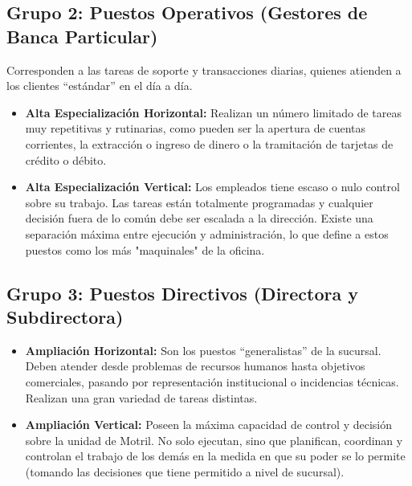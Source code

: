\subsection{Grupo 2: Puestos Operativos (Gestores de Banca Particular)}

Corresponden a las tareas de soporte y transacciones diarias, quienes atienden a los clientes ``estándar'' en el día a día.

\begin{itemize}
\item \textbf{Alta Especialización Horizontal:} Realizan un número limitado de tareas muy repetitivas y rutinarias, como pueden ser la apertura de cuentas corrientes, la extracción o ingreso de dinero o la tramitación de tarjetas de crédito o débito.
\item \textbf{Alta Especialización Vertical:} Los empleados tiene escaso o nulo control sobre su trabajo. Las tareas están totalmente programadas y cualquier decisión fuera de lo común debe ser escalada a la dirección. Existe una separación máxima entre ejecución y administración, lo que define a estos puestos como los más "maquinales" de la oficina.
\end{itemize}

\subsection{Grupo 3: Puestos Directivos (Directora y Subdirectora)}

\begin{itemize}
\item \textbf{Ampliación Horizontal:} Son los puestos ``generalistas'' de la sucursal. Deben atender desde problemas de recursos humanos hasta objetivos comerciales, pasando por representación institucional o incidencias técnicas. Realizan una gran variedad de tareas distintas.
\item \textbf{Ampliación Vertical:} Poseen la máxima capacidad de control y decisión sobre la unidad de Motril. No solo ejecutan, sino que planifican, coordinan y controlan el trabajo de los demás en la medida en que su poder se lo permite (tomando las decisiones que tiene permitido a nivel de sucursal).
\end{itemize}

